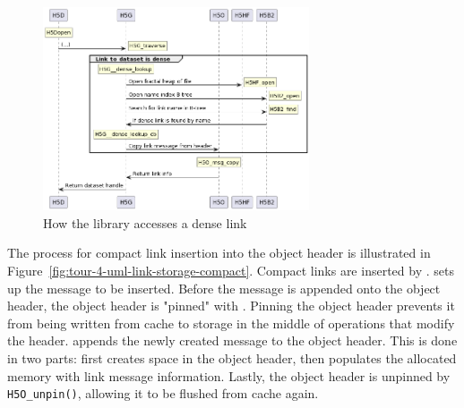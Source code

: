 \begin{figure}
\centering
\includegraphics[width=0.70\textwidth]{images/tour_4_uml_link_access_dense.png}
\caption{How the library accesses a dense link}
\label{fig:tour-4-uml-link-access-dense}
\end{figure}

The process for compact link insertion into the object header is illustrated in Figure~\ref{fig:tour-4-uml-link-storage-compact}. Compact links are inserted by .  sets up the message to be inserted. Before the message is appended onto the object header, the object header is "pinned" with . Pinning the object header prevents it from being written from cache to storage in the middle of operations that modify the header.  appends the newly created message to the object header. This is done in two parts: first  creates space in the object header, then  populates the allocated memory with link message information. Lastly, the object header is unpinned by \texttt{H5O\_unpin()}, allowing it to be flushed from cache again.

